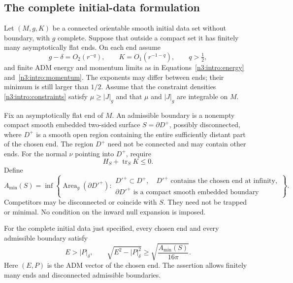 \subsection{The complete initial-data formulation}

Let $(M,g,K)$ be a connected orientable smooth initial data set without
boundary, with $g$ complete.  Suppose that outside a compact set it has
finitely many asymptotically flat ends.  On each end assume
\[
 g-\delta=O_2(r^{-q}),\qquad K=O_1(r^{-1-q}),\qquad q>\tfrac12,
\]
and finite ADM energy and momentum limits as in
Equations~\eqref{n3:intro:energy} and~\eqref{n3:intro:momentum}.
The exponents may differ between ends; their minimum is still larger
than $1/2$.  Assume that the constraint densities
\eqref{n3:intro:constraints} satisfy $\mu\ge |J|_g$ and that $\mu$ and
$|J|_g$ are integrable on $M$.

\begin{definition}
\label{bridge:intro:global-admissible}
Fix an asymptotically flat end of $M$.  An admissible boundary is a
nonempty compact smooth embedded two-sided surface $S=\partial D^+$,
possibly disconnected, where $D^+$ is a smooth open region containing
the entire sufficiently distant part of the chosen end.  The region
$D^+$ need not be connected and may contain other ends.  For the normal
$\nu$ pointing into $D^+$, require
\[
 H_S+\operatorname{tr}_S K\le0.
\]
Define
\begin{equation}
\label{bridge:intro:global-area}
 A_{\min}(S)=\inf\left\{
 \operatorname{Area}_g(\partial D'^+):
 \begin{array}{l}
 D'^+\subset D^+,\quad D'^+\text{ contains the chosen end at infinity},\\
 \partial D'^+\text{ is a compact smooth embedded boundary}
 \end{array}\right\}.
\end{equation}
Competitors may be disconnected or coincide with $S$.  They need not
be trapped or minimal.  No condition on the inward null expansion is
imposed.
\end{definition}

\begin{theorem}
\label{bridge:intro:global-penrose}
For the complete initial data just specified, every chosen end and
every admissible boundary satisfy
\begin{equation}
\label{bridge:intro:global-inequality}
 E>|P|_\delta,\qquad
 \sqrt{E^2-|P|_\delta^2}
       \ge \sqrt{\frac{A_{\min}(S)}{16\pi}}.
\end{equation}
Here $(E,P)$ is the ADM vector of the chosen end.  The assertion allows
finitely many ends and disconnected admissible boundaries.
\end{theorem}

